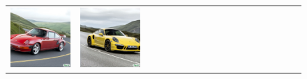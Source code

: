 \begin{figure}[ht!]
\begin{adjustwidth}{-0.8in}{-0.5in}
\begin{tabular}{cccccccccccccccccccc}
\multicolumn{2}{c}{\includegraphics[width=\threebythreecolwidth\textwidth]{figures/cherries/porsche1997.jpg}} &
\multicolumn{2}{c}{\includegraphics[width=\threebythreecolwidth\textwidth]{figures/cherries/porsche2017.jpg}} &&

\end{tabular}
\end{adjustwidth}
\end{figure}
